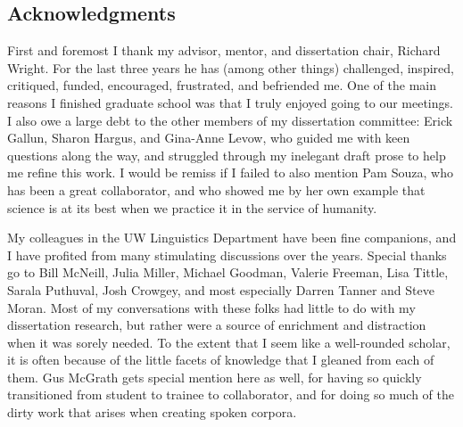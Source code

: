 \begin{spacing}{2}
\tableofcontents
\newpage

\listoffigures
\newpage

\listoftables
\newpage

\chapter*{Acknowledgments}
First and foremost I thank my advisor, mentor, and dissertation chair, Richard Wright.  For the last three years he has (among other things) challenged, inspired, critiqued, funded, encouraged, frustrated, and befriended me.  One of the main reasons I finished graduate school was that I truly enjoyed going to our meetings.  I also owe a large debt to the other members of my dissertation committee: Erick Gallun, Sharon Hargus, and Gina-Anne Levow, who guided me with keen questions along the way, and struggled through my inelegant draft prose to help me refine this work.  I would be remiss if I failed to also mention Pam Souza, who has been a great collaborator, and who showed me by her own example that science is at its best when we practice it in the service of humanity.  

My colleagues in the UW Linguistics Department have been fine companions, and I have profited from many stimulating discussions over the years.  Special thanks go to Bill McNeill, Julia Miller, Michael Goodman, Valerie Freeman, Lisa Tittle, Sarala Puthuval, Josh Crowgey, and most especially Darren Tanner and Steve Moran.  Most of my conversations with these folks had little to do with my dissertation research, but rather were a source of enrichment and distraction when it was sorely needed.  To the extent that I seem like a well-rounded scholar, it is often because of the little facets of knowledge that I gleaned from each of them.  Gus McGrath gets special mention here as well, for having so quickly transitioned from student to trainee to collaborator, and for doing so much of the dirty work that arises when creating spoken corpora.


\end{spacing}
